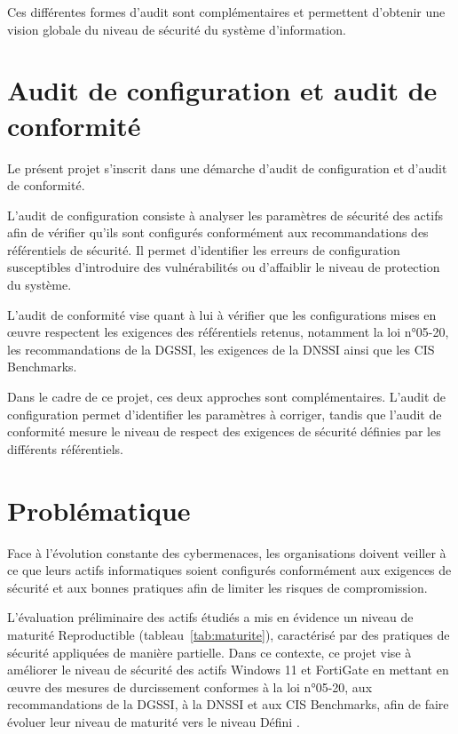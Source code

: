Ces différentes formes d'audit sont complémentaires et permettent d'obtenir une vision globale du niveau de sécurité du système d'information.

\section{Audit de configuration et audit de conformité}

Le présent projet s'inscrit dans une démarche d'audit de configuration et d'audit de conformité.

L'audit de configuration consiste à analyser les paramètres de sécurité des actifs afin de vérifier qu'ils sont configurés conformément aux recommandations des référentiels de sécurité. Il permet d'identifier les erreurs de configuration susceptibles d'introduire des vulnérabilités ou d'affaiblir le niveau de protection du système.

L'audit de conformité vise quant à lui à vérifier que les configurations mises en œuvre respectent les exigences des référentiels retenus, notamment la loi n°05-20, les recommandations de la DGSSI, les exigences de la DNSSI ainsi que les CIS Benchmarks.

Dans le cadre de ce projet, ces deux approches sont complémentaires. L'audit de configuration permet d'identifier les paramètres à corriger, tandis que l'audit de conformité mesure le niveau de respect des exigences de sécurité définies par les différents référentiels.

\section{Problématique}

Face à l'évolution constante des cybermenaces, les organisations doivent veiller à ce que leurs actifs informatiques soient configurés conformément aux exigences de sécurité et aux bonnes pratiques afin de limiter les risques de compromission.

L'évaluation préliminaire des actifs étudiés a mis en évidence un niveau de maturité \og Reproductible \fg{} (tableau~\ref{tab:maturite}), caractérisé par des pratiques de sécurité appliquées de manière partielle. Dans ce contexte, ce projet vise à améliorer le niveau de sécurité des actifs Windows 11 et FortiGate en mettant en œuvre des mesures de durcissement conformes à la loi n°05-20, aux recommandations de la DGSSI, à la DNSSI et aux CIS Benchmarks, afin de faire évoluer leur niveau de maturité vers le niveau \og Défini \fg{}.

